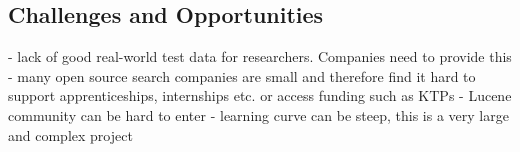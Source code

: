 \subsection{Challenges and Opportunities}


- lack of good real-world test data for researchers. Companies need to provide this
- many open source search companies are small and therefore find it hard to support apprenticeships, internships etc. or access funding such as KTPs
- Lucene community can be hard to enter - learning curve can be steep, this is a very large and complex project
